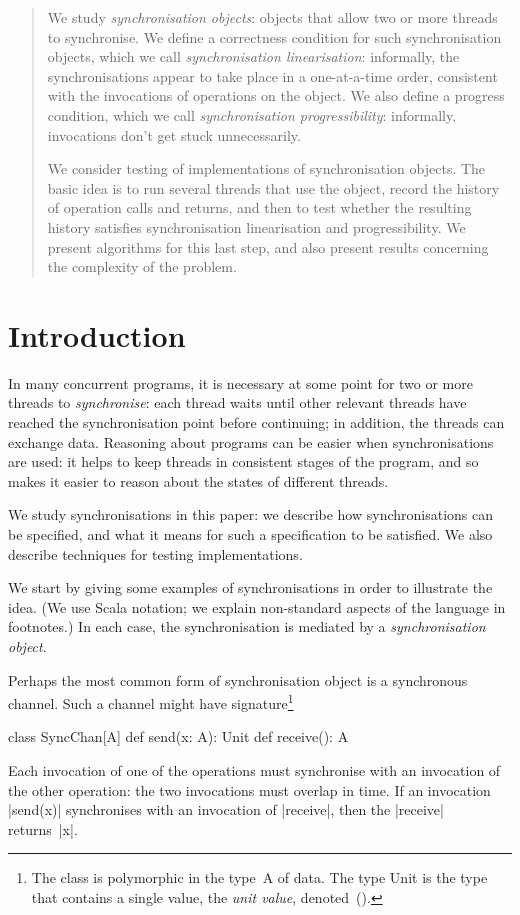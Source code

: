 \begin{abstract}
We study \emph{synchronisation objects}: objects that allow two or more
threads to synchronise.  We define a correctness condition for such
synchronisation objects, which we call \emph{synchronisation linearisation}:
informally, the synchronisations appear to take place in a one-at-a-time
order, consistent with the invocations of operations on the object.  We also
define a progress condition, which we call \emph{synchronisation
  progressibility}: informally, invocations don't get stuck unnecessarily. 

We consider testing of implementations of synchronisation objects.  The basic
idea is to run several threads that use the object, record the history of
operation calls and returns, and then to test whether the resulting history
satisfies synchronisation linearisation and progressibility.  We present
algorithms for this last step, and also present results concerning the
complexity of the problem.
\end{abstract}

\section{Introduction}

In many concurrent programs, it is necessary at some point for two or more
threads to \emph{synchronise}: each thread waits until other relevant threads
have reached the synchronisation point before continuing; in addition, the
threads can exchange data.  Reasoning about programs can be easier when
synchronisations are used: it helps to keep threads in consistent stages of
the program, and so makes it easier to reason about the states of different
threads.

We study synchronisations in this paper: we describe how synchronisations can
be specified, and what it means for such a specification to be satisfied.  We
also describe techniques for testing implementations.

We start by giving some examples of synchronisations in order to illustrate
the idea.  (We use Scala notation; we explain non-standard aspects of the
language in footnotes.)  In each case, the synchronisation is mediated by a
\emph{synchronisation object}.

Perhaps the most common form of synchronisation object is a synchronous
channel.  Such a channel might have signature\footnote{The class is
  polymorphic in the type~{\scalashape A} of data.  The type {\scalashape
    Unit} is the type that contains a single value, the \emph{unit value},
  denoted~{\scalashape ()}.}
%
\begin{scala}
class SyncChan[A]{
  def send(x: A): Unit
  def receive(): A
}
\end{scala}
%
Each invocation of one of the operations must synchronise with an invocation
of the other operation: the two invocations must overlap in time.  If an
invocation |send(x)| synchronises with an invocation of |receive|, then the
|receive| returns~|x|.

